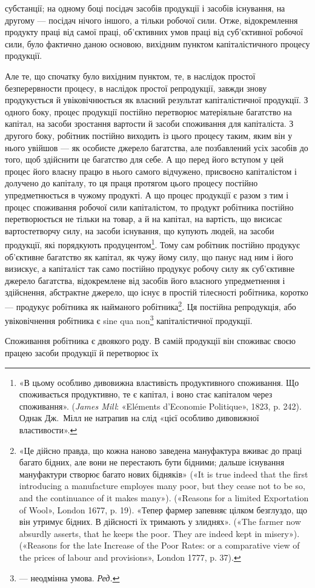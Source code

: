 \parcont{}  %
субстанції; на одному боці посідач засобів продукції і засобів
існування, на другому — посідач нічого іншого, а тільки робочої
сили. Отже, відокремлення продукту праці від самої праці, об’єктивних
умов праці від суб’єктивної робочої сили, було фактично
даною основою, вихідним пунктом капіталістичного процесу
продукції.

Але те, що спочатку було вихідним пунктом, те, в наслідок
простої безперервности процесу, в наслідок простої репродукції,
завжди знову продукується й увіковічнюється як власний результат
капіталістичної продукції. З одного боку, процес продукції
постійно перетворює матеріяльне багатство на капітал,
на засоби зростання вартости й засоби споживання для капіталіста.
З другого боку, робітник постійно виходить із цього процесу
таким, яким він у нього увійшов — як особисте джерело
багатства, але позбавлений усіх засобів до того, щоб здійснити
це багатство для себе. А що перед його вступом у цей процес
його власну працю в нього самого відчужено, присвоєно капіталістом
і долучено до капіталу, то ця праця протягом цього процесу
постійно упредметнюється в чужому продукті. А що процес
продукції є разом з тим і процес споживання робочої сили капіталістом,
то продукт робітника постійно перетворюється не
тільки на товар, а й на капітал, на вартість, що висисає вартостетворчу
силу, на засоби існування, що купують людей, на засоби
продукції, які порядкують продуцентом\footnote{
«В цьому особливо дивовижна властивість продуктивного споживання.
Що споживається продуктивно, те є капітал, і воно стає капіталом
через споживання». (\emph{James Mill}: «Eléments d’Economie Politique», 1823,
p. 242). Однак Дж.~Мілл не натрапив на слід «цієї особливо дивовижної
властивости».
}. Тому сам робітник
постійно продукує об’єктивне багатство як капітал, як чужу
йому силу, що панує над ним і його визискує, а капіталіст так
само постійно продукує робочу силу як суб’єктивне джерело
багатства, відокремлене від засобів його власного упредметнення
і здійснення, абстрактне джерело, що існує в простій тілесності
робітника, коротко — продукує робітника як найманого робітника\footnote{
«Це дійсно правда, що кожна наново заведена мануфактура вживає
до праці багато бідних, але вони не перестають бути бідними; дальше
існування мануфактури створює багато нових бідняків» («It is true indeed
that the first introducing a manufacture employes many poor, but
they cease not to be so, and the continuance of it makes many»). («Reasons
for a limited Exportation of Wool», London 1677, p. 19). «Тепер фармер
запевняє цілком безглуздо, що він утримує бідних. В дійсності їх тримають
у злиднях». («The farmer now absurdly asserts, that he keeps the
poor. They are indeed kept in misery»). («Reasons for the late Increase
of the Poor Rates: or a comparative view of the prices of labour and provisions»,
London 1777, p. 37).
}.
Ця постійна репродукція, або увіковічнення робітника
є sine qua non\footnote*{
— неодмінна умова. \emph{Ред.}
} капіталістичної продукції.

Споживання робітника є двоякого роду. В самій продукції
він споживає своєю працею засоби продукції й перетворює їх
\parbreak{}  %
